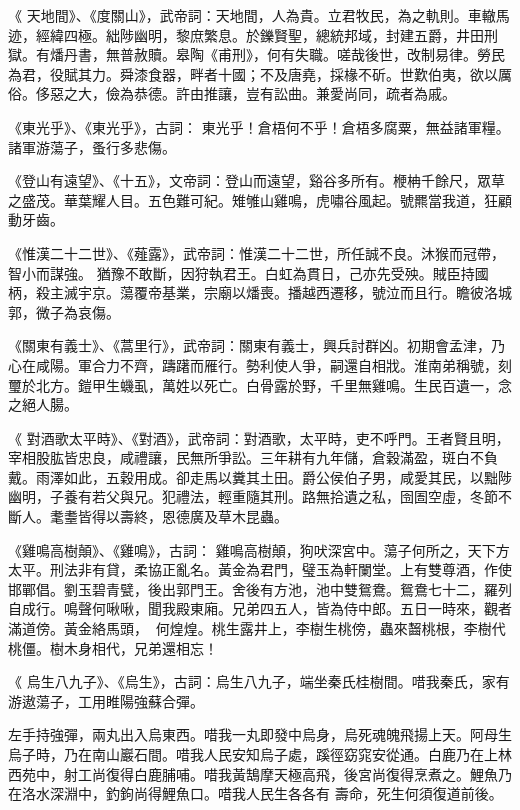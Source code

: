 \begin{pinyinscope}
 《
 天地間》、《度關山》，武帝詞：天地間，人為貴。立君牧民，為之軌則。車轍馬迹，經緯四極。絀陟幽明，黎庶繁息。於鑠賢聖，總統邦域，封建五爵，井田刑獄。有燔丹書，無普赦贖。皋陶《甫刑》，何有失職。嗟哉後世，改制易律。勞民為君，役賦其力。舜漆食器，畔者十國；不及唐堯，採椽不斫。世歎伯夷，欲以厲俗。侈惡之大，儉為恭德。許由推讓，豈有訟曲。兼愛尚同，疏者為戚。



 《東光乎》、《東光乎》，古詞：
 東光乎！倉梧何不乎！倉梧多腐粟，無益諸軍糧。諸軍游蕩子，蚤行多悲傷。



 《登山有遠望》、《十五》，文帝詞：登山而遠望，谿谷多所有。楩柟千餘尺，眾草之盛茂。華葉耀人目。五色難可紀。雉雊山雞鳴，虎嘯谷風起。號羆當我道，狂顧動牙齒。



 《惟漢二十二世》、《薤露》，武帝詞：惟漢二十二世，所任誠不良。沐猴而冠帶，智小而謀強。
 猶豫不敢斷，因狩執君王。白虹為貫日，己亦先受殃。賊臣持國柄，殺主滅宇京。蕩覆帝基業，宗廟以燔喪。播越西遷移，號泣而且行。瞻彼洛城郭，微子為哀傷。



 《關東有義士》、《蒿里行》，武帝詞：關東有義士，興兵討群凶。初期會孟津，乃心在咸陽。軍合力不齊，躊躇而雁行。勢利使人爭，嗣還自相戕。淮南弟稱號，刻璽於北方。鎧甲生蟣虱，萬姓以死亡。白骨露於野，千里無雞鳴。生民百遺一，念之絕人腸。



 《
 對酒歌太平時》、《對酒》，武帝詞：對酒歌，太平時，吏不呼門。王者賢且明，宰相股肱皆忠良，咸禮讓，民無所爭訟。三年耕有九年儲，倉穀滿盈，斑白不負戴。雨澤如此，五穀用成。卻走馬以糞其土田。爵公侯伯子男，咸愛其民，以黜陟幽明，子養有若父與兄。犯禮法，輕重隨其刑。路無拾遺之私，囹圄空虛，冬節不斷人。耄耋皆得以壽終，恩德廣及草木昆蟲。



 《雞鳴高樹顛》、《雞鳴》，古詞：
 雞鳴高樹顛，狗吠深宮中。蕩子何所之，天下方太平。刑法非有貸，柔協正亂名。黃金為君門，璧玉為軒闌堂。上有雙尊酒，作使邯鄲倡。劉玉碧青甓，後出郭門王。舍後有方池，池中雙鴛鴦。鴛鴦七十二，羅列自成行。鳴聲何啾啾，聞我殿東廂。兄弟四五人，皆為侍中郎。五日一時來，觀者滿道傍。黃金絡馬頭，何煌煌。桃生露井上，李樹生桃傍，蟲來齧桃根，李樹代桃僵。樹木身相代，兄弟還相忘！



 《
 烏生八九子》、《烏生》，古詞：烏生八九子，端坐秦氏桂樹間。唶我秦氏，家有游遨蕩子，工用睢陽強蘇合彈。



 左手持強彈，兩丸出入烏東西。唶我一丸即發中烏身，烏死魂魄飛揚上天。阿母生烏子時，乃在南山巖石間。唶我人民安知烏子處，蹊徑窈窕安從通。白鹿乃在上林西苑中，射工尚復得白鹿脯哺。唶我黃鵠摩天極高飛，後宮尚復得烹煮之。鯉魚乃在洛水深淵中，釣鉤尚得鯉魚口。唶我人民生各各有
 壽命，死生何須復道前後。




\end{pinyinscope}
